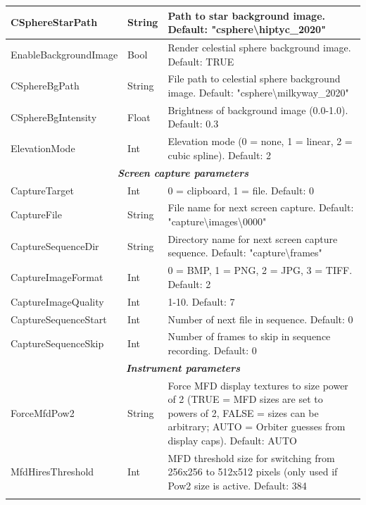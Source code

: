 \documentclass[Orbiter User Manual.tex]{subfiles}
\begin{document}
\begin{longtable}{ |p{}|p{}|p{}| }
	\hline\rule{0pt}{2ex}
	CSphereStarPath & String & Path to star background image. Default: "csphere\textbackslash hiptyc\_2020"\\
	\hline\rule{0pt}{2ex}
	EnableBackgroundImage & Bool & Render celestial sphere background image. Default: TRUE\\
	\hline\rule{0pt}{2ex}
	CSphereBgPath & String & File path to celestial sphere background image. Default: "csphere\textbackslash milkyway\_2020"\\
	\hline\rule{0pt}{2ex}
	CSphereBgIntensity & Float & Brightness of background image (0.0-1.0). Default: 0.3\\
	\hline\rule{0pt}{2ex}
	ElevationMode & Int & Elevation mode (0 = none, 1 = linear, 2 = cubic spline). Default: 2\\
	\hline
	\multicolumn{3}{|c|}{\rule{0pt}{2ex}\textbf{\textit{Screen capture parameters}}}\\
	\hline\rule{0pt}{2ex}
	CaptureTarget & Int & 0 = clipboard, 1 = file. Default: 0\\
	\hline\rule{0pt}{2ex}
	CaptureFile & String & File name for next screen capture. Default: "capture\textbackslash images\textbackslash 0000"\\
	\hline\rule{0pt}{2ex}
	CaptureSequenceDir & String & Directory name for next screen capture sequence. Default: "capture\textbackslash frames"\\
	\hline\rule{0pt}{2ex}
	CaptureImageFormat & Int & 0 = BMP, 1 = PNG, 2 = JPG, 3 = TIFF. Default: 2\\
	\hline\rule{0pt}{2ex}
	CaptureImageQuality & Int & 1-10. Default: 7\\
	\hline\rule{0pt}{2ex}
	CaptureSequenceStart & Int & Number of next file in sequence. Default: 0\\
	\hline\rule{0pt}{2ex}
	CaptureSequenceSkip & Int & Number of frames to skip in sequence recording. Default: 0\\
	\hline
	\multicolumn{3}{|c|}{\rule{0pt}{2ex}\textbf{\textit{Instrument parameters}}}\\
	\hline\rule{0pt}{2ex}
	ForceMfdPow2 & String & Force MFD display textures to size power of 2 (TRUE = MFD sizes are set to powers of 2, FALSE = sizes can be arbitrary; AUTO = Orbiter guesses from display caps). Default: AUTO\\
	\hline\rule{0pt}{2ex}
	MfdHiresThreshold & Int & MFD threshold size for switching from 256x256 to 512x512 pixels (only used if Pow2 size is active. Default: 384\\
	\hline\rule{0pt}{2ex}

\end{longtable}
\end{document}
